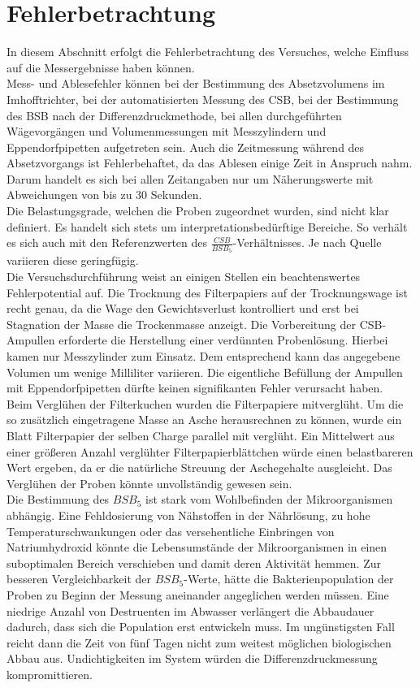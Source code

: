 \chapter{Fehlerbetrachtung}
\label{sec:fehler}
In diesem Abschnitt erfolgt die Fehlerbetrachtung des Versuches, welche Einfluss auf die Messergebnisse haben können.\\

Mess- und Ablesefehler können bei der Bestimmung des Absetzvolumens im Imhofftrichter, bei der automatisierten Messung des CSB, bei der Bestimmung des BSB nach der Differenzdruckmethode, bei allen durchgeführten Wägevorgängen und Volumenmessungen mit Messzylindern und Eppendorfpipetten aufgetreten sein. Auch die Zeitmessung während des Absetzvorgangs ist Fehlerbehaftet, da das Ablesen einige Zeit in Anspruch nahm. Darum handelt es sich bei allen Zeitangaben nur um Näherungswerte mit Abweichungen von bis zu 30 Sekunden.\\
Die Belastungsgrade, welchen die Proben zugeordnet wurden, sind nicht klar definiert. Es handelt sich stets um interpretationsbedürftige Bereiche. So verhält es sich auch mit den Referenzwerten des $\frac{CSB}{BSB_5}$-Verhältnisses. Je nach Quelle variieren diese geringfügig. \\
Die Versuchsdurchführung weist an einigen Stellen ein beachtenswertes Fehlerpotential auf. Die Trocknung des Filterpapiers auf der Trocknungswage ist recht genau, da die Wage den Gewichtsverlust kontrolliert und erst bei Stagnation der Masse die Trockenmasse anzeigt. Die Vorbereitung der CSB-Ampullen erforderte die Herstellung einer verdünnten Probenlösung. Hierbei kamen nur Messzylinder zum Einsatz. Dem entsprechend kann das angegebene Volumen um wenige Milliliter variieren. Die eigentliche Befüllung der Ampullen mit Eppendorfpipetten dürfte keinen signifikanten Fehler verursacht haben. \\ 
Beim Verglühen der Filterkuchen wurden die Filterpapiere mitverglüht. Um die so zusätzlich eingetragene Masse an Asche herausrechnen zu können, wurde ein Blatt Filterpapier der selben Charge parallel mit verglüht. Ein Mittelwert aus einer größeren Anzahl verglühter Filterpapierblättchen würde einen belastbareren Wert ergeben, da er die natürliche Streuung der Aschegehalte ausgleicht. Das Verglühen der Proben könnte unvollständig gewesen sein. \\
Die Bestimmung des $BSB_5$ ist stark vom Wohlbefinden der Mikroorganismen abhängig. Eine Fehldosierung von Nähstoffen in der Nährlösung, zu hohe Temperaturschwankungen oder das versehentliche Einbringen von Natriumhydroxid könnte die Lebensumstände der Mikroorganismen in einen suboptimalen Bereich verschieben und damit deren Aktivität hemmen. Zur besseren Vergleichbarkeit der $BSB_5$-Werte, hätte die Bakterienpopulation der Proben zu Beginn der Messung aneinander angeglichen werden müssen. Eine niedrige Anzahl von Destruenten im Abwasser verlängert die Abbaudauer dadurch, dass sich die Population erst entwickeln muss. Im ungünstigsten Fall reicht dann die Zeit von fünf Tagen nicht zum weitest möglichen biologischen Abbau aus. Undichtigkeiten im System würden die Differenzdruckmessung kompromittieren. 

